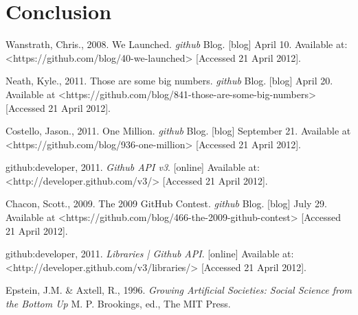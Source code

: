 \documentclass{article}
\begin{document}
  \section{Conclusion}

  \begin{thebibliography}{1}

    Wanstrath, Chris., 2008. We Launched. \emph{github} Blog. [blog] April 10. Available at: \textless{}https://github.com/blog/40-we-launched\textgreater{} [Accessed 21 April 2012].

    Neath, Kyle., 2011. Those are some big numbers. \emph{github} Blog. [blog] April 20. Available at \textless{}https://github.com/blog/841-those-are-some-big-numbers\textgreater{} [Accessed 21 April 2012].

    Costello, Jason., 2011. One Million. \emph{github} Blog. [blog] September 21. Available at \textless{}https://github.com/blog/936-one-million\textgreater{} [Accessed 21 April 2012].

    github:developer, 2011. \emph{Github API v3}. [online] Available at: <http://developer.github.com/v3/> [Accessed 21 April 2012].
  
    Chacon, Scott., 2009. The 2009 GitHub Contest. \emph{github} Blog. [blog] July 29. Available at \textless{}https://github.com/blog/466-the-2009-github-contest\textgreater{} [Accessed 21 April 2012].

    github:developer, 2011. \emph{Libraries | Github API}. [online] Available at: <http://developer.github.com/v3/libraries/> [Accessed 21 April 2012].
    

    Epstein, J.M. \& Axtell, R., 1996. \emph{Growing Artificial Societies: Social Science from the Bottom Up} M. P. Brookings, ed., The MIT Press.

  \end{thebibliography}
\end{document}
